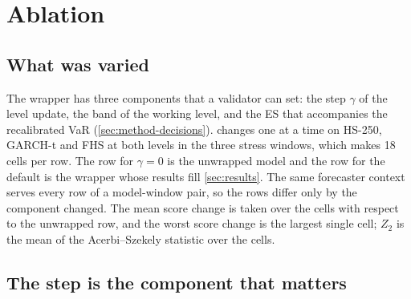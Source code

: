 \section{Ablation}
\label{sec:ablation}

\subsection{What was varied}
\label{sec:ablation-setup}

The wrapper has three components that a validator can set: the step $\gamma$ of the level update, the band of the working level, and the ES that accompanies the recalibrated VaR (\cref{sec:method-decisions}).  changes one at a time on HS-250, GARCH-t and FHS at both levels in the three stress windows, which makes 18 cells per row. The row for $\gamma = 0$ is the unwrapped model and the row for the default is the wrapper whose results fill \cref{sec:results}. The same forecaster context serves every row of a model-window pair, so the rows differ only by the component changed. The mean score change is taken over the cells with respect to the unwrapped row, and the worst score change is the largest single cell; $Z_2$ is the mean of the Acerbi--Szekely statistic over the cells.



\subsection{The step is the component that matters}
\label{sec:ablation-step}

